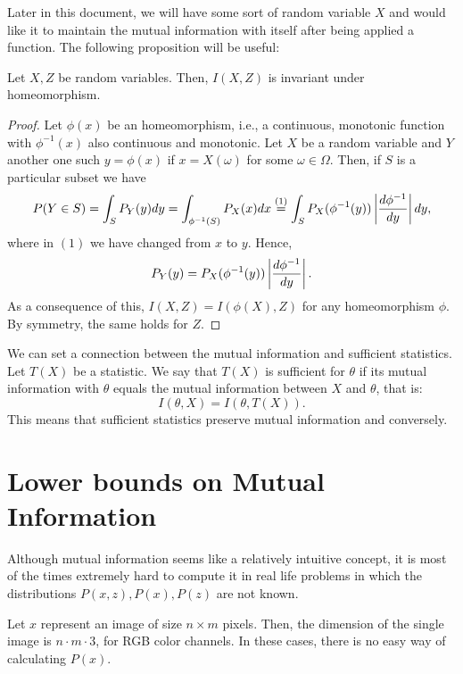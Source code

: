 Later in this document, we will have some sort of random variable $X$ and would like it to maintain the mutual information with itself after being applied a function. The following proposition will be useful:

\begin{nprop}
Let $X,Z$ be random variables. Then, $I(X,Z)$ is invariant under homeomorphism.
\end{nprop}
\begin{proof}
Let $\phi(x)$ be an homeomorphism, i.e., a continuous, monotonic function with $\phi^{-1}(x)$ also continuous and monotonic. Let $X$ be a random variable and $Y$ another one such $y = \phi(x)$ if $x = X(\omega)$ for some $\omega \in \Omega$. Then, if $S$ is a particular subset we have 
\[
P(Y \in S) = \int_S P_Y(y) dy = \int_{\phi^{-1}(S)}P_X(x) dx \stackrel{(1)}{=} \int_S P_X(\phi^{-1}(y)) \left\lvert \frac{d \phi^{-1}}{dy}\right\rvert dy,
\]
where in $(1)$ we have changed from $x$ to $y$. Hence, 
\[
P_Y(y) = P_X(\phi^{-1}(y))\left\lvert\frac{d \phi^{-1}}{dy}\right\rvert.
\]
As a consequence of this, $I(X,Z) = I(\phi(X),Z) $ for any homeomorphism $\phi$. By symmetry, the same holds for $Z$.

\end{proof}

\begin{remark} We can set a connection between the mutual information and sufficient statistics. Let $T(X)$ be a statistic. We say that $T(X)$  is sufficient for $\theta$ if its mutual information with $\theta$ equals the mutual information between $X$ and $\theta$, that is:
$$
I(\theta, X) = I (\theta, T(X)).
$$
This means that sufficient statistics preserve mutual information and conversely.
\end{remark}

\section{Lower bounds on Mutual Information}

Although mutual information seems like a relatively intuitive concept, it is most of the times extremely hard to compute it in real life problems in which the distributions $P(x,z),P(x),P(z)$ are not known.
\begin{nexample}
Let $x$ represent an image of size $n \times m$ pixels. Then, the dimension of the single image is $n \cdot m \cdot 3$, for RGB color channels. In these cases, there is no easy way of calculating $P(x)$.
\end{nexample}

